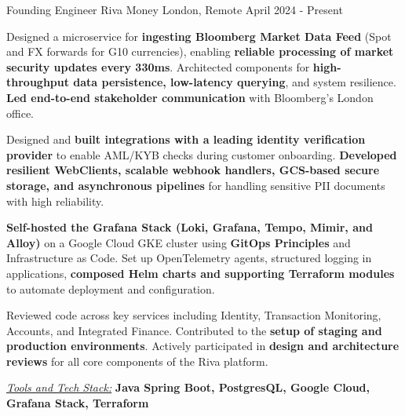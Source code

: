 \documentclass[11pt, a4paper]{awesome-cv} %
\begin{document}
\begin{cventries}

  \cventry
    {Founding Engineer} %
    {Riva Money} %
    {London, Remote} %
    {April 2024 - Present} %
    {
      \begin{cvitems} %
        \item {Designed a microservice for \textbf{ingesting Bloomberg Market Data Feed} (Spot and FX forwards for G10 currencies), enabling \textbf{reliable processing of market security updates every 330ms}. Architected components for \textbf{high-throughput data persistence, low-latency querying}, and system resilience. \\
        \textbf{Led end-to-end stakeholder communication} with Bloomberg’s London office.}
        \item {Designed and \textbf{built integrations with a leading identity verification provider} to enable AML/KYB checks during customer onboarding. \textbf{Developed resilient WebClients, scalable webhook handlers, GCS-based secure storage, and asynchronous pipelines} for handling sensitive PII documents with high reliability.}
        \item {\textbf{Self-hosted the Grafana Stack (Loki, Grafana, Tempo, Mimir, and Alloy)} on a Google Cloud GKE cluster using \textbf{GitOps Principles} and Infrastructure as Code. Set up OpenTelemetry agents, structured logging in applications, \textbf{composed Helm charts and supporting Terraform modules} to automate deployment and configuration.}
        \item {Reviewed code across key services including Identity, Transaction Monitoring, Accounts, and Integrated Finance. Contributed to the \textbf{setup of staging and production environments}. Actively participated in \textbf{design and architecture reviews} for all core components of the Riva platform.}
        \item {\textit{\href{}{\color{awesome-red} Tools and Tech Stack:}} \textbf{Java Spring Boot, PostgresQL, Google Cloud, Grafana Stack, Terraform}}
      \end{cvitems}
    }


\end{cventries}
\end{document}

